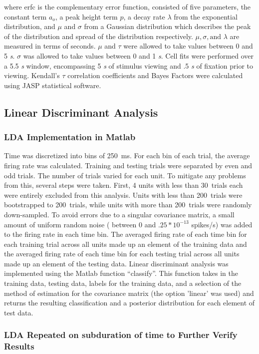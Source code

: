 \documentclass{apa}
\begin{document}
where erfc is the complementary error function, consisted of five parameters,
the constant term $a_o$, a peak height term $p$, a decay rate $\lambda$ from the
exponential distribution, and $\mu$ and $\sigma$ from a Gaussian distribution
which describes the peak of the distribution and spread of the distribution
respectively. $\mu, \sigma, \text{and } \lambda$ are measured in terms of
seconds. $\mu$ and $\tau$ were allowed to take values between 0 and 5
\emph{s}. $\sigma$ was allowed to take values between 0 and 1 \emph{s}. Cell
fits were performed over a 5.5 \emph{s} window, encompassing 5 \emph{s} of
stimulus viewing and .5 \emph{s} of fixation prior to viewing. Kendall's
$\tau$ correlation coefficients and Bayes Factors were calculated using JASP
statistical software.

\subsection{Linear Discriminant Analysis}
\subsubsection{LDA Implementation in Matlab}
Time
was discretized into bins of 250~ms.  For each bin of each trial, the average firing rate was calculated.
Training and testing trials were separated by even and odd
trials.  The number of trials varied for each unit.  To mitigate any problems
from this, several steps were taken.  First, 4 units with less than 30~trials
each were entirely excluded from this analysis.  
Units with less than 200~trials were bootstrapped to 200~trials, while units
with more than 200~trials were randomly down-sampled.
To avoid errors due to a singular covariance matrix, a small amount of uniform
random noise ( between $0$ and $.25*10^{-13}$ spikes/s) was added to the
firing rate in each time bin.  The averaged firing rate of each time bin for
each training trial across all units made up an element of the training data and the averaged
firing rate of each time bin for each testing trial across all units made up an element of the
testing data.  Linear discriminant analysis was implemented using the Matlab
function ``classify''.  This function takes in the training data, testing
data, labels for the training data, and a selection of the method of
estimation for the covariance matrix (the option 'linear' was used) and
returns the resulting classification and a posterior distribution for each
element of test data.  

\subsubsection{LDA Repeated on subduration of time to Further Verify Results}
\end{document}
